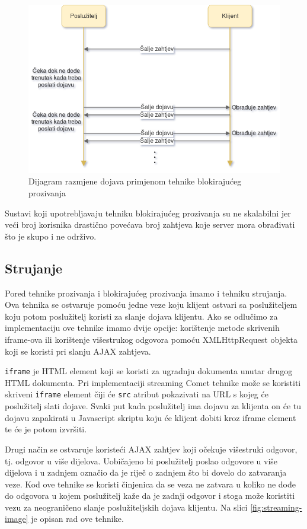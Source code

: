 \documentclass[times, utf8, zavrsni]{fer}
\begin{document}
\begin{figure}[htb]
\centering
\includegraphics[width=14cm]{img/long-polling.png}
\caption{Dijagram razmjene dojava primjenom tehnike blokirajućeg prozivanja}
\label{fig:long-polling-image}
\end{figure}

Sustavi koji upotrebljavaju tehniku blokirajućeg prozivanja su ne skalabilni jer veći broj korisnika drastično povećava broj zahtjeva koje server mora obrađivati što je skupo i ne održivo. 

\subsection{Strujanje}
Pored tehnike prozivanja i blokirajućeg prozivanja imamo i tehniku strujanja. Ova tehnika se ostvaruje pomoću jedne veze koju klijent ostvari sa poslužiteljem koju potom poslužitelj koristi za slanje dojava klijentu. Ako se odlučimo za implementaciju ove tehnike imamo dvije opcije: korištenje metode skrivenih iframe-ova ili korištenje višestrukog odgovora pomoću XMLHttpRequest objekta koji se koristi pri slanju AJAX zahtjeva.

{\tt iframe} je HTML element koji se koristi za ugradnju dokumenta unutar drugog HTML dokumenta. Pri implementaciji streaming Comet tehnike može se koristiti skriveni {\tt iframe} element čiji će {\tt src}  atribut pokazivati na URL s kojeg će poslužitelj slati dojave. Svaki put kada poslužitelj ima dojavu za klijenta on će tu dojavu zapakirati u Javascript skriptu koju će klijent dobiti kroz iframe element te će je potom izvršiti.

Drugi način se ostvaruje koristeći AJAX zahtjev koji očekuje višestruki odgovor, tj. odgovor u više dijelova. Uobičajeno bi poslužitelj poslao odgovore u više dijelova i u zadnjem označio da je riječ o zadnjem što bi dovelo do zatvaranja veze. Kod ove tehnike se koristi činjenica da se veza ne zatvara u koliko ne dođe do odgovora u kojem poslužitelj kaže da je zadnji odgovor i stoga može koristiti vezu za neograničeno slanje poslužiteljskih dojava klijentu. Na slici \ref{fig:streaming-image} je opisan rad ove tehnike. \citep{carbou2011}
\end{document}
